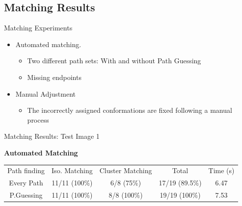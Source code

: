 \documentclass[xcolor=table]{beamer}
\begin{document}
\subsection{Matching Results}
\begin{frame}{Matching Experiments}

  \begin{itemize}
  \item Automated matching. 
    \begin{itemize}
    \item Two different path sets: With and without Path Guessing 
    \item Missing endpoints 
    \end{itemize}
  \item Manual Adjustment
    \begin{itemize}
    \item The incorrectly assigned conformations are fixed following
      a manual process
    \end{itemize}
    
  \end{itemize}
  

\end{frame}

\begin{frame}{Matching Results: Test Image 1}

\large \textbf{Automated Matching}
\begin{scriptsize}
\begin{table}[h]
\begin{center}
\begin{tabular}[h]{|c|c|c|c|c|}
    \hline
    \rowcolor{gray!35}
    Path finding & Iso. Matching & Cluster Matching 
    & Total
    & Time (s) \\
    Every Path & 11/11 (100\%) & 6/8 (75\%) & 17/19 (\alert{89.5\%})& 6.47 \\
    \hline
    P.Guessing & 11/11 (100\%) & 8/8 (100\%) & 19/19 (\alert{100\%}) & 7.53 \\     
    \hline  
  \end{tabular}
\end{center}
\end{table}
\end{scriptsize} 
\end{frame}
\end{document}

